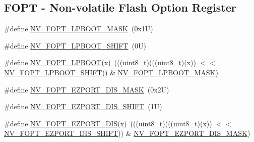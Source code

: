 \subsection*{F\+O\+PT -\/ Non-\/volatile Flash Option Register}
\begin{DoxyCompactItemize}
\item 
\#define \mbox{\hyperlink{group___n_v___register___masks_gabe7cb388b4a9f41cc264e7df5ecdf883}{N\+V\+\_\+\+F\+O\+P\+T\+\_\+\+L\+P\+B\+O\+O\+T\+\_\+\+M\+A\+SK}}~(0x1\+U)
\item 
\#define \mbox{\hyperlink{group___n_v___register___masks_ga2fc27fe10cf14eb30613e131fe7e758e}{N\+V\+\_\+\+F\+O\+P\+T\+\_\+\+L\+P\+B\+O\+O\+T\+\_\+\+S\+H\+I\+FT}}~(0\+U)
\item 
\#define \mbox{\hyperlink{group___n_v___register___masks_gae5ca20e0c3befb0118e1ef25aa1c0e26}{N\+V\+\_\+\+F\+O\+P\+T\+\_\+\+L\+P\+B\+O\+OT}}(x)~(((uint8\+\_\+t)(((uint8\+\_\+t)(x)) $<$$<$ \mbox{\hyperlink{group___n_v___register___masks_ga2fc27fe10cf14eb30613e131fe7e758e}{N\+V\+\_\+\+F\+O\+P\+T\+\_\+\+L\+P\+B\+O\+O\+T\+\_\+\+S\+H\+I\+FT}})) \& \mbox{\hyperlink{group___n_v___register___masks_gabe7cb388b4a9f41cc264e7df5ecdf883}{N\+V\+\_\+\+F\+O\+P\+T\+\_\+\+L\+P\+B\+O\+O\+T\+\_\+\+M\+A\+SK}})
\item 
\#define \mbox{\hyperlink{group___n_v___register___masks_ga5c130a6f11de9f04a77b36fd61843e8f}{N\+V\+\_\+\+F\+O\+P\+T\+\_\+\+E\+Z\+P\+O\+R\+T\+\_\+\+D\+I\+S\+\_\+\+M\+A\+SK}}~(0x2\+U)
\item 
\#define \mbox{\hyperlink{group___n_v___register___masks_gabf1111ccacc4104b2855c4f3851cbaa5}{N\+V\+\_\+\+F\+O\+P\+T\+\_\+\+E\+Z\+P\+O\+R\+T\+\_\+\+D\+I\+S\+\_\+\+S\+H\+I\+FT}}~(1\+U)
\item 
\#define \mbox{\hyperlink{group___n_v___register___masks_ga39e5d6519d8e4396a93815f07610d0b0}{N\+V\+\_\+\+F\+O\+P\+T\+\_\+\+E\+Z\+P\+O\+R\+T\+\_\+\+D\+IS}}(x)~(((uint8\+\_\+t)(((uint8\+\_\+t)(x)) $<$$<$ \mbox{\hyperlink{group___n_v___register___masks_gabf1111ccacc4104b2855c4f3851cbaa5}{N\+V\+\_\+\+F\+O\+P\+T\+\_\+\+E\+Z\+P\+O\+R\+T\+\_\+\+D\+I\+S\+\_\+\+S\+H\+I\+FT}})) \& \mbox{\hyperlink{group___n_v___register___masks_ga5c130a6f11de9f04a77b36fd61843e8f}{N\+V\+\_\+\+F\+O\+P\+T\+\_\+\+E\+Z\+P\+O\+R\+T\+\_\+\+D\+I\+S\+\_\+\+M\+A\+SK}})
\end{DoxyCompactItemize}
